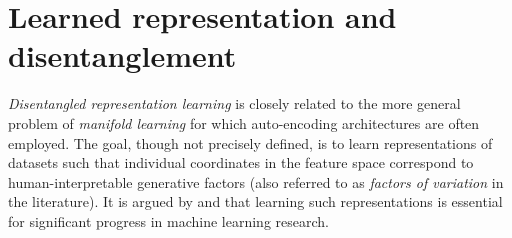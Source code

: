 \vspace{-0.2cm}

\section{\label{section:disentanglement}Learned representation and disentanglement}

\vspace{-0.2cm}


\emph{Disentangled representation learning} is closely related to the more general problem of \emph{manifold learning} for which auto-encoding architectures are often employed. The goal, though not precisely defined, is to learn representations of datasets such that individual coordinates in the feature space correspond to human-interpretable generative factors  (also referred to as \emph{factors of variation} in the literature). It is argued by \citet{bengio2013representation} and \citet{lake2017building} that learning such representations is essential for significant progress in machine learning research.

